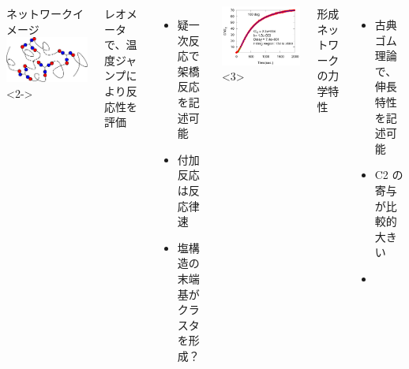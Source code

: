 \documentclass[12pt, dvipdfmx]{beamer}
\begin{document}
\begin{frame}
\begin{columns}[T, totalwidth=\linewidth]
	{\scriptsize ネットワークイメージ}
	\includegraphics[width=\columnwidth]{./fig/Network_2.pdf}
<2->
	{\scriptsize 
	レオメータで、温度ジャンプにより反応性を評価
	\begin{itemize}
	\item
	疑一次反応で架橋反応を記述可能
	\item
	付加反応は反応律速
	\item
	塩構造の末端基がクラスタを形成？
	\end{itemize}
	}
	\includegraphics[width=\columnwidth]{./fig/Cure_100deg.pdf}
<3>
	{\scriptsize
	形成ネットワークの力学特性
	\begin{itemize}
	\item
	古典ゴム理論で、伸長特性を記述可能
	\item
	C2 の寄与が比較的大きい
	\item

\end{itemize}}
\end{columns}
\end{frame}
\end{document}
